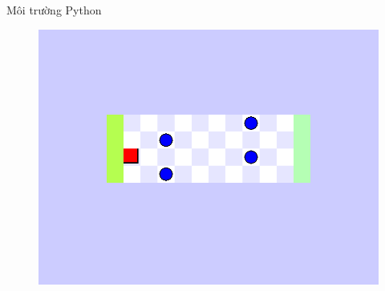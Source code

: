 \documentclass{beamer}
\begin{document}
\begin{frame}{Môi trường Python}
	\begin{figure}
		\centering
		\includegraphics[scale=.3]{Pic/slide/new_env}
		\captionsetup{labelformat=empty}
	\end{figure}
\end{frame}
\end{document}
